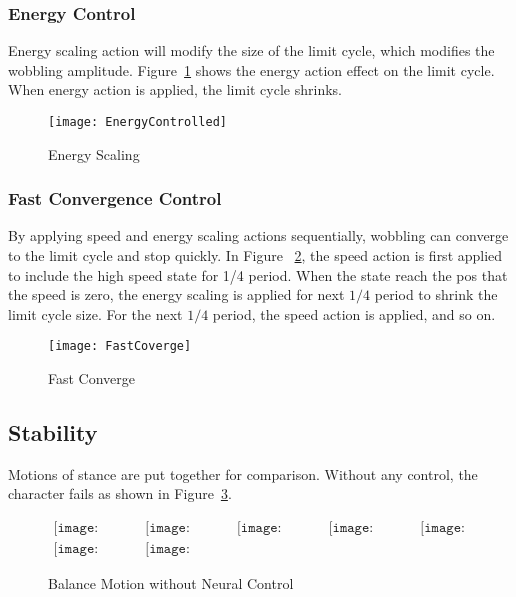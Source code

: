 \subsubsection*{Energy Control}
Energy scaling action will modify the size of the limit cycle, which modifies the wobbling amplitude.
Figure~\ref{fig:energyscaling} shows the energy action effect on the limit cycle.
When energy action is applied, the limit cycle shrinks.


\begin{figure}[!htbp]
  \begin{center}
      \texttt{[image: EnergyControlled]}
    \caption{Energy Scaling}
    \label{fig:energyscaling}
\end{center}
\end{figure}





\subsubsection*{Fast Convergence Control}
By applying speed and energy scaling actions sequentially, wobbling can converge to the limit cycle and stop quickly.
In Figure ~\ref{fig:fastconverg}, the speed action is first applied to include the high speed state for 1/4 period. 
When the state reach the pos that the speed is zero, the energy scaling is applied for next $1/4$ period to shrink the limit cycle size.
For the next $1/4$ period,  the speed action is applied, and so on.

\begin{figure}[!htbp]
  \begin{center}
      \texttt{[image: FastCoverge]}
    \caption{Fast Converge}
    \label{fig:fastconverg}
\end{center}
\end{figure}

\subsection{Stability}
Motions of stance are put together for comparison.
Without any control, the character fails as shown in Figure~\ref{fig:stancefall}.
\begin{figure}[h]
\begin{center}$
\begin{array}{ccccc}
\texttt{[image: stanceFall/0001.eps]}&
\texttt{[image: stanceFall/0021.eps]}&
\texttt{[image: stanceFall/0041.eps]}&
\texttt{[image: stanceFall/0061.eps]}&
\texttt{[image: stanceFall/0081.eps]}
\\
\texttt{[image: stanceFall/0101.eps]}&
\texttt{[image: stanceFall/0121.eps]}
\end{array}$
\end{center}
\caption{Balance Motion without Neural Control}
    \label{fig:stancefall}
\end{figure}

